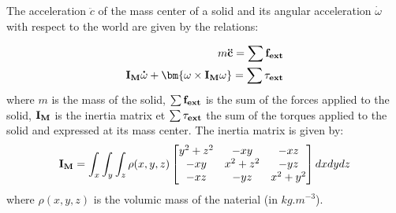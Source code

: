 The acceleration $\ddot c$ of the mass center of a solid and its angular acceleration $\dot \omega$ with respect to the world are given by the relations:

    \begin{eqnarray*}
        m \bf{ \ddot c } = \sum\bf{f_{ext}} \\%
        \bf{ I_M \dot \omega } + \bm{ \omega \times I_M \omega} = \sum\bf{\tau_{ext}} %
    \end{eqnarray*}
where $m$ is the mass of the solid, $\sum {\bf f_{ext}}$ is the sum of the forces applied to the solid, ${\bf I_M}$ is the inertia matrix et $\sum {\bf \tau_{ext}}$ the sum of the torques applied to the solid and expressed at its mass center. The inertia matrix is given by:
$${\bf I_M} = \int_x \int_y \int_z \rho (x,y,z)\begin{bmatrix}  y^2+z^2 & -xy & -xz \\ -xy & x^2+z^2 & -yz \\ -xz & -yz & x^2+y^2 \end{bmatrix} dx dy dz$$
where $\rho(x,y,z)$ is the volumic mass of the naterial (in $kg.m^{-3}$).


